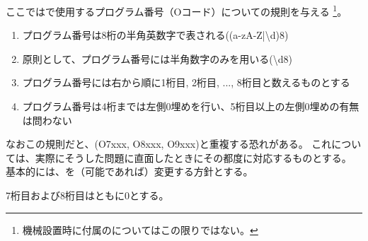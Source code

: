 

ここでは\DMC で使用するプログラム番号（Oコード）についての規則を与える
\footnote{機械設置時に付属の\BundledNCPrg についてはこの限りではない。}。



\begin{enumerate}[label=\Roman*., ref=\Roman*]
\item {}プログラム番号は8桁の半角英数字で表される({\ttfamily(a-zA-Z|\textbackslash d){8}})
\item 原則として、プログラム番号には半角数字のみを用いる({\ttfamily\textbackslash d{8}})
\item {}プログラム番号には右から順に1桁目, 2桁目, ..., 8桁目と数えるものとする
\item\label{item:PNbasicGE4}プログラム番号は4桁までは左側0埋めを行い、5桁目以上の左側0埋めの有無は問わない
\end{enumerate}
\begin{hosoku}
なおこの規則だと、\BundledNCPrg(O7xxx, O8xxx, O9xxx)と重複する恐れがある。
これについては、実際にそうした問題に直面したときにその都度に対応するものとする。
基本的には、\BundledNCPrg を（可能であれば）変更する方針とする。
\end{hosoku}


7桁目および8桁目はともに0とする。

